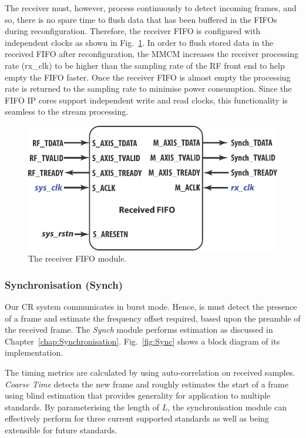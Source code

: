 The receiver must, however, process continuously to detect incoming frames, and so, there is no spare time to flush data that has been buffered in the FIFOs during reconfiguration.
Therefore, the receiver FIFO is configured with independent clocks as shown in Fig.~\ref{fig:FIFO}.
In order to flush stored data in the received FIFO after reconfiguration, the MMCM increases the receiver processing rate (rx\_clk) to be higher than the sampling rate of the RF front end to help empty the FIFO faster.
Once the receiver FIFO is almost empty the processing rate is returned to the sampling rate to minimise power consumption.
Since the FIFO IP cores support independent write and read clocks, this functionality is seamless to the stream processing.
\begin{figure}
\centering
\includegraphics [width=0.5\columnwidth]{Figures/MSCR_RX_FIFO.pdf}
\caption{The receiver FIFO module.}
\label{fig:FIFO}
\end{figure}

\subsubsection{Synchronisation (Synch)}
Our CR system communicates in burst mode.
Hence, is must detect the presence of a frame and estimate the frequency offset required, based upon the preamble of the received frame.
The \emph{Synch} module performs estimation as discussed in Chapter~\ref{chap:Synchronisation}.
Fig.~\ref{fig:Sync} shows a block diagram of its implementation.

The timing metrics are calculated by using auto-correlation on received samples.
\emph{Coarse Time} detects the new frame and roughly estimates the start of a frame using blind estimation that provides generality for application to multiple standards.
By parameterising the length of $L$, the synchronisation module can effectively perform for three current supported standards as well as being extensible for future standards.

